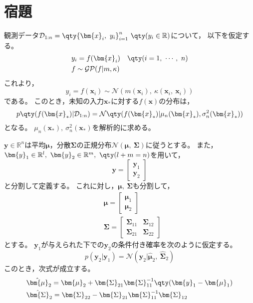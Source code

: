 \documentclass[class=jsarticle, crop=false, dvipdfmx, fleqn]{standalone}
\begin{document}
\section*{宿題}

観測データ\(\mathcal{D}_{1:n} = \qty{\bm{x}_i,\ y_i}_{i=1}^{n}\ \qty(y_i \in \mathbb{R})\)について，
以下を仮定する。
\begin{align}
    & y_i = f(\bm{x}_i) \quad \qty(i = 1,\ \cdots,\ n ) \\
    & f \sim \mathcal{GP}(f | m, \kappa)
\end{align}
これより，
\begin{equation}
    y_i = f(\bm{x}_i) \sim \mathcal{N}(m(\bm{x}_i),\ \kappa(\bm{x}_i,\ \bm{x}_i))
\end{equation}
である。
このとき，未知の入力\(\bm{x}_{*}\)に対する\(f(\bm{x})\)の分布は，
\begin{equation}
    p\qty(f(\bm{x}_{*}) | \mathcal{D}_{1:n}) = \mathcal{N}\qty(f(\bm{x}_{*}) | \mu_n (\bm{x}_{*}), \sigma_n^2 (\bm{x}_{*}) )
\end{equation}
となる。
\(\mu_n (\bm{x}_{*}),\ \sigma_n^2 (\bm{x}_{*})\)を解析的に求める。

\(\bm{y} \in \mathbb{R}^{n}\)は平均\(\bm{\mu}\)，分散\(\bm{\Sigma}\)の正規分布\(\mathcal{N}(\bm{\mu},\ \bm{\Sigma})\)に従うとする。
また，\(\bm{y}_1 \in \mathbb{R}^{l},\ \bm{y}_2 \in \mathbb{R}^{m},\ \qty(l + m = n)\)を用いて，
\begin{equation}
    \bm{y} =
        \begin{bmatrix}
            \bm{y}_1 \\ \bm{y}_2
        \end{bmatrix}
    \label{eq:y_split}
\end{equation}
と分割して定義する。
これに対し，\(\bm{\mu},\ \bm{\Sigma}\)も分割して，
\begin{align}
    & \bm{\mu} =
        \begin{bmatrix}
            \bm{\mu}_1 \\ \bm{\mu}_2
        \end{bmatrix} \\
    & \bm{\Sigma} =
        \begin{bmatrix}
            \bm{\Sigma}_{11} & \bm{\Sigma}_{12} \\
            \bm{\Sigma}_{21} & \bm{\Sigma}_{22}
        \end{bmatrix}
\end{align}
とする。
\(\bm{y}_1\)が与えられた下での\(\bm{y}_2\)の条件付き確率を次のように仮定する。
\begin{equation}
    p(\bm{y}_2 | \bm{y}_1) = \mathcal{N}(\bm{y}_2 | \hat{\bm{\mu}}_2,\ \hat{\bm{\Sigma}}_2)
\end{equation}
このとき，次式が成立する。
\begin{align}
    & \hat{\bm{\mu}}_2 = \bm{\mu}_2 + \bm{\Sigma}_{21} \bm{\Sigma}_{11}^{-1} \qty(\bm{y}_1 - \bm{\mu}_1) \\
    & \hat{\bm{\Sigma}}_2 = \bm{\Sigma}_{22} - \bm{\Sigma}_{21} \bm{\Sigma}_{11}^{-1} \bm{\Sigma}_{12}
    \label{eq:sigma_2_hat}
\end{align}
\end{document}
